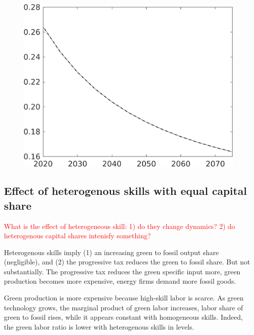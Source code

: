 \documentclass[12pt]{article}
\newcommand{\tr}[1]{\textcolor{red}{#1}}
\begin{document}
\begin{figure}
\begin{minipage}[]{0.32\textwidth}
	\end{minipage}	
	\begin{minipage}[]{0.32\textwidth}
		\includegraphics[width=1\textwidth]{../../codding_model/own_basedOnFried/optimalPol_010922_revision/figures/all_13Sept22/CompTaul_Equlab_LFBAU_Reg0_sg_spillover0_nsk1_xgr0_knspil0_sep1_countec0_GovRev0_etaa0.79_lgd0.png}
	\end{minipage}	
\end{figure}
\clearpage \newpage
\subsection{Effect of heterogenous skills with equal capital share}
\tr{What is the effect of heterogeneous skill: 1) do they change dynamics? 2) do heterogenous capital shares intenisfy something?}

Heterogenous skills imply (1) an increasing green to fossil output share (negligible), and (2) the progressive tax reduces the green to fossil share. But not substantially. 
The progressive tax reduces the green specific input more, green production becomes more expensive, energy firms demand more fossil goods. 

Green production is more expensive because high-skill labor is scarce. As green technology grows, the marginal product of green labor increases, labor share of green to fossil rises, while it appears constant with homogeneous skills. Indeed, the green labor ratio is lower with heterogenous skills in levels. 
\end{document}
